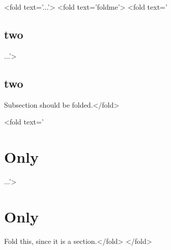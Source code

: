 <fold text='...'>
    <fold text='foldme'>%
    <fold text='\subsection{two}...'>\subsection{two}
    Subsection should be folded.</fold>

    <fold text='\section{Only}...'>\section{Only}
    Fold this, since it is a section.</fold>
</fold>
